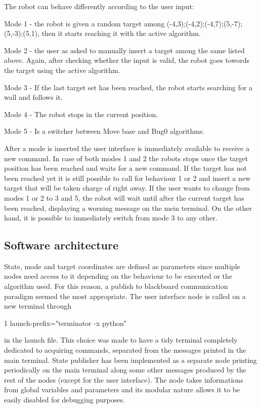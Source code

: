 The robot can behave differently according to the user input\+:
\begin{DoxyItemize}
\item Mode 1 -\/ the robot is given a random target among (-\/4,3);(-\/4,2);(-\/4,7);(5,-\/7);(5,-\/3);(5,1), then it starts reaching it with the active algorithm.
\item Mode 2 -\/ the user as asked to manually insert a target among the same listed above. Again, after checking whether the input is valid, the robot goes towords the target using the active algorithm.
\item Mode 3 -\/ If the last target set has been reached, the robot starts searching for a wall and follows it.
\item Mode 4 -\/ The robot stops in the current position.
\item Mode 5 -\/ Is a switcher between Move base and Bug0 algorithms.
\end{DoxyItemize}

After a mode is inserted the user interface is immediately available to receive a new command. In case of both modes 1 and 2 the robots stops once the target position has been reached and waits for a new command. If the target has not been reached yet it is still possible to call for behaviour 1 or 2 and insert a new target that will be taken charge of right away. If the user wants to change from modes 1 or 2 to 3 and 5, the robot will wait until after the current target has been reached, displaying a worning message on the mein terminal. On the other hand, it is possible to immediately switch from mode 3 to any other.

\subsection*{Software architecture}

State, mode and target coordinates are defined as parameters since multiple nodes need access to it depending on the behaviour to be executed or the algorithm used. For this reason, a publish to blackboard communication paradigm seemed the most appropriate. The user interface node is called on a new terminal through


\begin{DoxyCode}
1 launch-prefix="terminator -x python"
\end{DoxyCode}
 in the launch file. This choice was made to have a tidy terminal completely dedicated to acquiring commands, separated from the messages printed in the main terminal. State publisher has been implemented as a separate node printing periodically on the main terminal along some other messages produced by the rest of the nodes (except for the user interface). The node takes informations from global variables and parameters and its modular nature allows it to be easily disabled for debugging purposes.

